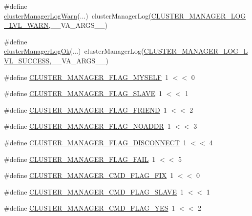 \begin{DoxyCompactItemize}
\item 
\#define \hyperlink{redis-cli_8c_a2b0dfe70c8d75e47b95362a8a45b70f2}{cluster\+Manager\+Log\+Warn}(...)~cluster\+Manager\+Log(\hyperlink{redis-cli_8c_a75e1edf48f2deecde01c5f5b7a3549c5}{C\+L\+U\+S\+T\+E\+R\+\_\+\+M\+A\+N\+A\+G\+E\+R\+\_\+\+L\+O\+G\+\_\+\+L\+V\+L\+\_\+\+W\+A\+RN},\+\_\+\+\_\+\+V\+A\+\_\+\+A\+R\+G\+S\+\_\+\+\_\+)
\item 
\#define \hyperlink{redis-cli_8c_a1c989d91de01aaed261eb69873661323}{cluster\+Manager\+Log\+Ok}(...)~cluster\+Manager\+Log(\hyperlink{redis-cli_8c_a6a754ca7f60f191d71265d2c35c0cdde}{C\+L\+U\+S\+T\+E\+R\+\_\+\+M\+A\+N\+A\+G\+E\+R\+\_\+\+L\+O\+G\+\_\+\+L\+V\+L\+\_\+\+S\+U\+C\+C\+E\+SS},\+\_\+\+\_\+\+V\+A\+\_\+\+A\+R\+G\+S\+\_\+\+\_\+)
\item 
\#define \hyperlink{redis-cli_8c_a8b6dbe68da44cffbcf45bb44d1574bd4}{C\+L\+U\+S\+T\+E\+R\+\_\+\+M\+A\+N\+A\+G\+E\+R\+\_\+\+F\+L\+A\+G\+\_\+\+M\+Y\+S\+E\+LF}~1 $<$$<$ 0
\item 
\#define \hyperlink{redis-cli_8c_a71c336d14254f8563ad5adee17d49511}{C\+L\+U\+S\+T\+E\+R\+\_\+\+M\+A\+N\+A\+G\+E\+R\+\_\+\+F\+L\+A\+G\+\_\+\+S\+L\+A\+VE}~1 $<$$<$ 1
\item 
\#define \hyperlink{redis-cli_8c_a5b6e3ef8d7a248fed729c7067e0aa905}{C\+L\+U\+S\+T\+E\+R\+\_\+\+M\+A\+N\+A\+G\+E\+R\+\_\+\+F\+L\+A\+G\+\_\+\+F\+R\+I\+E\+ND}~1 $<$$<$ 2
\item 
\#define \hyperlink{redis-cli_8c_ad87d5059bdadc2b00b015732b565b354}{C\+L\+U\+S\+T\+E\+R\+\_\+\+M\+A\+N\+A\+G\+E\+R\+\_\+\+F\+L\+A\+G\+\_\+\+N\+O\+A\+D\+DR}~1 $<$$<$ 3
\item 
\#define \hyperlink{redis-cli_8c_aa0c98d5851933187ac92da57d02a01dc}{C\+L\+U\+S\+T\+E\+R\+\_\+\+M\+A\+N\+A\+G\+E\+R\+\_\+\+F\+L\+A\+G\+\_\+\+D\+I\+S\+C\+O\+N\+N\+E\+CT}~1 $<$$<$ 4
\item 
\#define \hyperlink{redis-cli_8c_ae74a382109f1c7974121633ecacdd904}{C\+L\+U\+S\+T\+E\+R\+\_\+\+M\+A\+N\+A\+G\+E\+R\+\_\+\+F\+L\+A\+G\+\_\+\+F\+A\+IL}~1 $<$$<$ 5
\item 
\#define \hyperlink{redis-cli_8c_ab247bf3596e7714242c2d6588398d346}{C\+L\+U\+S\+T\+E\+R\+\_\+\+M\+A\+N\+A\+G\+E\+R\+\_\+\+C\+M\+D\+\_\+\+F\+L\+A\+G\+\_\+\+F\+IX}~1 $<$$<$ 0
\item 
\#define \hyperlink{redis-cli_8c_a1b85abca246a47325395c55c78ea3f5e}{C\+L\+U\+S\+T\+E\+R\+\_\+\+M\+A\+N\+A\+G\+E\+R\+\_\+\+C\+M\+D\+\_\+\+F\+L\+A\+G\+\_\+\+S\+L\+A\+VE}~1 $<$$<$ 1
\item 
\#define \hyperlink{redis-cli_8c_ad877f695c8c9a523fa3d265dea853020}{C\+L\+U\+S\+T\+E\+R\+\_\+\+M\+A\+N\+A\+G\+E\+R\+\_\+\+C\+M\+D\+\_\+\+F\+L\+A\+G\+\_\+\+Y\+ES}~1 $<$$<$ 2
$$
\end{DoxyCompactItemize}
